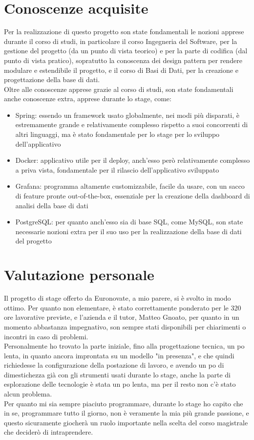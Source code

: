 \section{Conoscenze acquisite}
	Per la realizzazione di questo progetto son state fondamentali le nozioni apprese durante il corso di studi, in particolare il corso Ingegneria del Software, per la gestione del progetto (da un punto di vista teorico) e per la parte di codifica (dal punto di vista pratico), sopratutto la conoscenza dei design pattern per rendere modulare e estendibile il progetto, e il corso di Basi di Dati, per la creazione e progettazione della base di dati. \\
	Oltre alle conoscenze apprese grazie al corso di studi, son state fondamentali anche conoscenze extra, apprese durante lo stage, come:
	\begin{itemize}
		\item Spring: essendo un framework usato globalmente, nei modi più disparati, è estremamente grande e relativamente complesso rispetto a suoi concorrenti di altri linguaggi, ma è stato fondamentale per lo stage per lo sviluppo dell'applicativo
		\item Docker: applicativo utile per il deploy, anch'esso però relativamente complesso a priva vista, fondamentale per il rilascio dell'applicativo sviluppato
		\item Grafana: programma altamente customizzabile, facile da usare, con un sacco di feature pronte out-of-the-box, essenziale per la creazione della dashboard di analisi della base di dati
		\item PostgreSQL: per quanto anch'esso sia di base SQL, come MySQL, son state necessarie nozioni extra per il suo uso per la realizzazione della base di dati del progetto 
	\end{itemize}
	

\section{Valutazione personale}
	Il progetto di stage offerto da Euronovate, a mio parere, si è svolto in modo ottimo. Per quanto non elementare, è stato correttamente ponderato per le 320 ore lavorative previste, e l'azienda e il tutor, Matteo Gnoato, per quanto in un momento abbastanza impegnativo, son sempre stati disponibili per chiarimenti o incontri in caso di problemi. \\
	Personalmente ho trovato la parte iniziale, fino alla progettazione tecnica,  un po lenta, in quanto ancora improntata su un modello "in presenza", e che quindi richiedesse la configurazione della postazione di lavoro, e avendo un po di dimestichezza già con gli strumenti usati durante lo stage, anche la parte di esplorazione delle tecnologie è stata un po lenta, ma per il resto non c'è stato alcun problema. \\
	Per quanto mi sia sempre piaciuto programmare, durante lo stage ho capito che in se, programmare tutto il giorno, non è veramente la mia più grande passione, e questo sicuramente giocherà un ruolo importante nella scelta del corso magistrale che deciderò di intraprendere.
